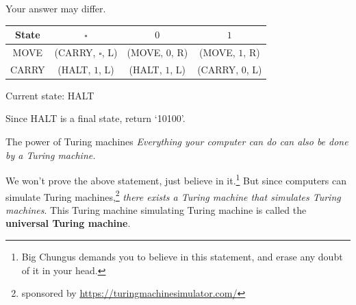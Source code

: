 \documentclass{beamer}
\begin{document}
\begin{frame}{Your answer may differ.}






\begin{center}
\begin{tabular}{c|c|c|c}
State & $\square$ & $0$ & $1$\\
\hline
MOVE & (CARRY, $\square$, L) & (MOVE, $0$, R) & (MOVE, $1$, R)\\
\hline
CARRY & (HALT, $1$, L) & (HALT, $1$, L) & (CARRY, $0$, L)\\
\end{tabular}
\end{center}
Current state: HALT 

\begin{center}
\end{center}

Since HALT is a final state, return `10100'.

\end{frame}

\begin{frame}{The power of Turing machines}
\textit{Everything your computer can do can also be done by a Turing machine.}

\vspace{2mm}

We won't prove the above statement, just believe in it.\footnote{Big Chungus demands you to believe in this statement, and erase any doubt of it in your head.} But since computers can simulate Turing machines,\footnote{sponsored by \url{https://turingmachinesimulator.com/}} \textit{there exists a Turing machine that simulates Turing machines}. This Turing machine simulating Turing machine is called the \textbf{universal Turing machine}.
\end{frame}
\end{document}
